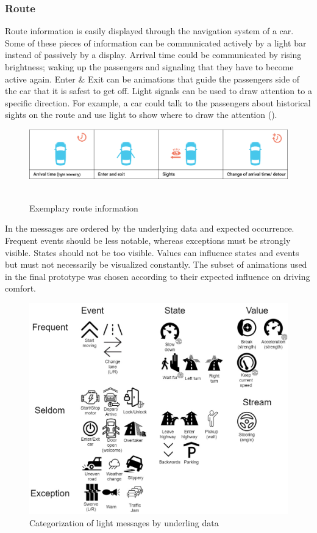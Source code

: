 \subsubsection{Route}
Route information is easily displayed through the navigation system of a car. Some of these pieces of information can be communicated actively by a light bar instead of passively by a display. Arrival time could be communicated by rising brightness; waking up the passengers and signaling that they have to become active again. Enter \& Exit can be animations that guide the passengers side of the car that it is safest to get off. Light signals can be used to draw attention to a specific direction. For example, a car could talk to the passengers about historical sights on the route and use light to show where to draw the attention (\emph{}). 
\begin{figure}
    \includegraphics[width=1\textwidth]{fig/route.png}\hfill\
    \caption[Route information]{Exemplary route information}
    \label{fig:route}
\end{figure}

 In \emph{} the messages are ordered by the underlying data and expected occurrence. Frequent events should be less notable, whereas exceptions must be strongly visible. States should not be too visible. Values can influence states and events but must not necessarily be visualized constantly. The subset of animations used in the final prototype was chosen according to their expected influence on driving comfort. 
 
\begin{figure}
    \includegraphics[width=\textwidth]{fig/tab-}
    \caption[Light Events]{Categorization of light messages by underling data}
    \label{fig:lightevents}
\end{figure}

